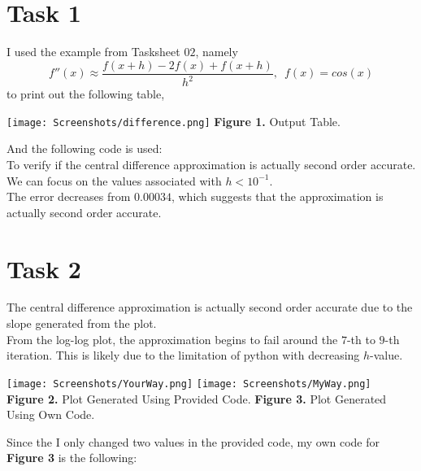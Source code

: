 \documentclass{article}
\begin{document}
\section*{Task 1}
I used the example from Tasksheet $02$, namely 
$$f''(x) \approx \dfrac{f(x+h) - 2f(x) + f(x+h)}{h^2}, \,\,\, f(x) = cos(x)$$
to print out the following table, 
\begin{center}
\texttt{[image: Screenshots/difference.png]}
{\bf Figure 1.} Output Table.
\end{center}
And the following code is used:\\


To verify if the central difference approximation is actually second order accurate. We can focus on the values associated with $h < 10^{-1}$.\\ 
The error decreases from $0.00034$, which suggests that the approximation is actually second order accurate.

\newpage

\section*{Task 2}
The central difference approximation is actually second order accurate due to the slope generated from the plot. \\
From the log-log plot, the approximation begins to fail around the $7$-th to $9$-th iteration. This is likely due to the limitation of python with decreasing $h$-value.
\begin{center}
\texttt{[image: Screenshots/YourWay.png]} \hspace{10pt} \texttt{[image: Screenshots/MyWay.png]}\\
{\bf Figure 2.} Plot Generated Using Provided Code. \hspace{12pt} {\bf Figure 3.} Plot Generated Using Own Code. 
\end{center}
Since the I only changed two values in the provided code, my own code for {\bf Figure 3} is the following:


\pagebreak
\end{document}
